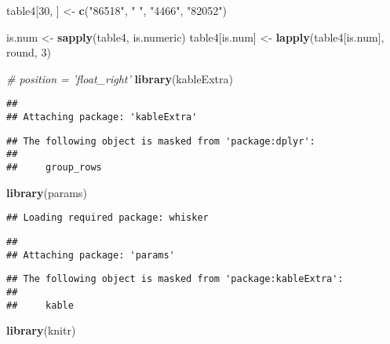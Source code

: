 \documentclass[]{tufte-handout}
\newenvironment{Shaded}{\begin{snugshade}}{\end{snugshade}}
\newcommand{\KeywordTok}[1]{\textcolor[rgb]{0.13,0.29,0.53}{\textbf{#1}}}
\newcommand{\DecValTok}[1]{\textcolor[rgb]{0.00,0.00,0.81}{#1}}
\newcommand{\StringTok}[1]{\textcolor[rgb]{0.31,0.60,0.02}{#1}}
\newcommand{\CommentTok}[1]{\textcolor[rgb]{0.56,0.35,0.01}{\textit{#1}}}
\newcommand{\NormalTok}[1]{#1}
\begin{document}
\begin{Shaded}
\begin{Highlighting}[]
\NormalTok{table4[}\DecValTok{30}\NormalTok{, ] <-}\StringTok{ }\KeywordTok{c}\NormalTok{(}\StringTok{"86518"}\NormalTok{, }\StringTok{" "}\NormalTok{, }\StringTok{"4466"}\NormalTok{, }\StringTok{"82052"}\NormalTok{)}

\NormalTok{is.num <-}\StringTok{ }\KeywordTok{sapply}\NormalTok{(table4, is.numeric)}
\NormalTok{table4[is.num] <-}\StringTok{ }\KeywordTok{lapply}\NormalTok{(table4[is.num], round, }
    \DecValTok{3}\NormalTok{)}
\end{Highlighting}
\end{Shaded}

\begin{Shaded}
\begin{Highlighting}[]
\CommentTok{# position = 'float_right'}
\KeywordTok{library}\NormalTok{(kableExtra)}
\end{Highlighting}
\end{Shaded}

\begin{verbatim}
## 
## Attaching package: 'kableExtra'
\end{verbatim}

\begin{verbatim}
## The following object is masked from 'package:dplyr':
## 
##     group_rows
\end{verbatim}

\begin{Shaded}
\begin{Highlighting}[]
\KeywordTok{library}\NormalTok{(params)}
\end{Highlighting}
\end{Shaded}

\begin{verbatim}
## Loading required package: whisker
\end{verbatim}

\begin{verbatim}
## 
## Attaching package: 'params'
\end{verbatim}

\begin{verbatim}
## The following object is masked from 'package:kableExtra':
## 
##     kable
\end{verbatim}

\begin{Shaded}
\begin{Highlighting}[]
\KeywordTok{library}\NormalTok{(knitr)}
\end{Highlighting}
\end{Shaded}
\end{document}
